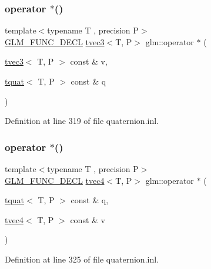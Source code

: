\subsubsection{\texorpdfstring{operator $\ast$()}{operator *()}\hspace{0.1cm}{\footnotesize\ttfamily [3/7]}}
{\footnotesize\ttfamily template$<$typename T , precision P$>$ \\
\mbox{\hyperlink{setup_8hpp_ab2d052de21a70539923e9bcbf6e83a51}{G\+L\+M\+\_\+\+F\+U\+N\+C\+\_\+\+D\+E\+CL}} \mbox{\hyperlink{structglm_1_1tvec3}{tvec3}}$<$T, P$>$ glm\+::operator $\ast$ (\begin{DoxyParamCaption}\item[{\mbox{\hyperlink{structglm_1_1tvec3}{tvec3}}$<$ T, P $>$ const \&}]{v,  }\item[{\mbox{\hyperlink{structglm_1_1tquat}{tquat}}$<$ T, P $>$ const \&}]{q }\end{DoxyParamCaption})}



Definition at line 319 of file quaternion.\+inl.

\mbox{\label{group__gtc__quaternion_gab63797896ca2db7fd5afa10ee01cf60f}} 
\subsubsection{\texorpdfstring{operator $\ast$()}{operator *()}\hspace{0.1cm}{\footnotesize\ttfamily [4/7]}}
{\footnotesize\ttfamily template$<$typename T , precision P$>$ \\
\mbox{\hyperlink{setup_8hpp_ab2d052de21a70539923e9bcbf6e83a51}{G\+L\+M\+\_\+\+F\+U\+N\+C\+\_\+\+D\+E\+CL}} \mbox{\hyperlink{structglm_1_1tvec4}{tvec4}}$<$T, P$>$ glm\+::operator $\ast$ (\begin{DoxyParamCaption}\item[{\mbox{\hyperlink{structglm_1_1tquat}{tquat}}$<$ T, P $>$ const \&}]{q,  }\item[{\mbox{\hyperlink{structglm_1_1tvec4}{tvec4}}$<$ T, P $>$ const \&}]{v }\end{DoxyParamCaption})}



Definition at line 325 of file quaternion.\+inl.

\mbox{\label{group__gtc__quaternion_gaac2743bed4951a088d72e41e0c72a2cc}} 
